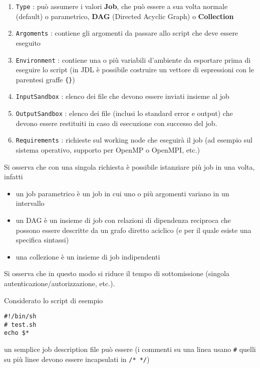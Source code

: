 \documentclass[italian,]{article}
\providecommand{\tightlist}{%
  \setlength{\itemsep}{0pt}\setlength{\parskip}{0pt}}
\begin{document}
\begin{enumerate}
\def\labelenumi{\arabic{enumi}.}
\tightlist
\item
  \texttt{Type} : può assumere i valori \textbf{Job}, che può essere a
  sua volta normale (default) o parametrico, \textbf{DAG} (Directed
  Acyclic Graph) o \textbf{Collection}
\item
  \texttt{Argoments} : contiene gli argomenti da passare allo script che
  deve essere eseguito
\item
  \texttt{Environment} : contiene una o più variabili d'ambiente da
  esportare prima di eseguire lo script (in JDL è possibile costruire un
  vettore di espressioni con le parentesi graffe \texttt{\{\}})
\item
  \texttt{InputSandbox} : elenco dei file che devono essere inviati
  insieme al job
\item
  \texttt{OutputSandbox} : elenco dei file (inclusi lo standard error e
  output) che devono essere restituiti in caso di esecuzione con
  successo del job.
\item
  \texttt{Requirements} : richieste sul working node che eseguirà il job
  (ad esempio sul sistema operativo, supporto per OpenMP o OpenMPI,
  etc.)
\end{enumerate}

Si osserva che con una singola richiesta è possibile istanziare più job
in una volta, infatti

\begin{itemize}
\tightlist
\item
  un job parametrico è un job in cui uno o più argomenti variano in un
  intervallo
\item
  un DAG è un insieme di job con relazioni di dipendenza reciproca che
  possono essere descritte da un grafo diretto aciclico (e per il quale
  esiste una specifica sintassi)
\item
  una collezione è un insieme di job indipendenti
\end{itemize}

Si osserva che in questo modo si riduce il tempo di sottomissione
(singola autenticazione/autorizzazione, etc.).

Considerato lo script di esempio

\begin{verbatim}
#!/bin/sh
# test.sh
echo $*
\end{verbatim}

un semplice job description file può essere (i commenti su una linea
usano \texttt{\#} quelli su più linee devono essere incapsulati in
\texttt{/*\ */})
\end{document}
